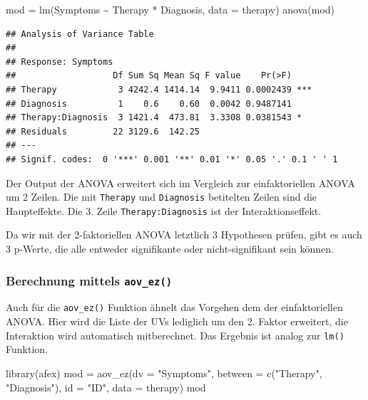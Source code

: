 \documentclass[
]{book}
\newenvironment{Shaded}{\begin{snugshade}}{\end{snugshade}}
\newcommand{\AttributeTok}[1]{\textcolor[rgb]{0.77,0.63,0.00}{#1}}
\newcommand{\FunctionTok}[1]{\textcolor[rgb]{0.00,0.00,0.00}{#1}}
\newcommand{\NormalTok}[1]{#1}
\newcommand{\OtherTok}[1]{\textcolor[rgb]{0.56,0.35,0.01}{#1}}
\newcommand{\SpecialCharTok}[1]{\textcolor[rgb]{0.00,0.00,0.00}{#1}}
\newcommand{\StringTok}[1]{\textcolor[rgb]{0.31,0.60,0.02}{#1}}
\begin{document}
\begin{Shaded}
\begin{Highlighting}[]
\NormalTok{mod }\OtherTok{=} \FunctionTok{lm}\NormalTok{(Symptoms }\SpecialCharTok{\textasciitilde{}}\NormalTok{ Therapy }\SpecialCharTok{*}\NormalTok{ Diagnosis, }\AttributeTok{data =}\NormalTok{ therapy)}
\FunctionTok{anova}\NormalTok{(mod)}
\end{Highlighting}
\end{Shaded}

\begin{verbatim}
## Analysis of Variance Table
## 
## Response: Symptoms
##                   Df Sum Sq Mean Sq F value    Pr(>F)    
## Therapy            3 4242.4 1414.14  9.9411 0.0002439 ***
## Diagnosis          1    0.6    0.60  0.0042 0.9487141    
## Therapy:Diagnosis  3 1421.4  473.81  3.3308 0.0381543 *  
## Residuals         22 3129.6  142.25                      
## ---
## Signif. codes:  0 '***' 0.001 '**' 0.01 '*' 0.05 '.' 0.1 ' ' 1
\end{verbatim}

Der Output der ANOVA erweitert sich im Vergleich zur einfaktoriellen ANOVA um 2 Zeilen. Die mit \texttt{Therapy} und \texttt{Diagnosis} betitelten Zeilen sind die Haupteffekte. Die 3. Zeile \texttt{Therapy:Diagnosis} ist der Interaktionseffekt.

Da wir mit der 2-faktoriellen ANOVA letztlich 3 Hypothesen prüfen, gibt es auch 3 p-Werte, die alle entweder signifikante oder nicht-signifikant sein können.

\hypertarget{berechnung-mittels-aov_ez-1}{%
\subsubsection{\texorpdfstring{Berechnung mittels \texttt{aov\_ez()}}{Berechnung mittels aov\_ez()}}\label{berechnung-mittels-aov_ez-1}}

Auch für die \texttt{aov\_ez()} Funktion ähnelt das Vorgehen dem der einfaktoriellen ANOVA. Hier wird die Liste der UVs lediglich um den 2. Faktor erweitert, die Interaktion wird automatisch mitberechnet. Das Ergebnis ist analog zur \texttt{lm()} Funktion.

\begin{Shaded}
\begin{Highlighting}[]
\FunctionTok{library}\NormalTok{(afex)}
\NormalTok{mod }\OtherTok{=} \FunctionTok{aov\_ez}\NormalTok{(}\AttributeTok{dv =} \StringTok{"Symptoms"}\NormalTok{, }\AttributeTok{between =} \FunctionTok{c}\NormalTok{(}\StringTok{"Therapy"}\NormalTok{, }\StringTok{"Diagnosis"}\NormalTok{), }\AttributeTok{id =} \StringTok{"ID"}\NormalTok{, }\AttributeTok{data =}\NormalTok{ therapy)}
\NormalTok{mod}
\end{Highlighting}
\end{Shaded}
\end{document}
